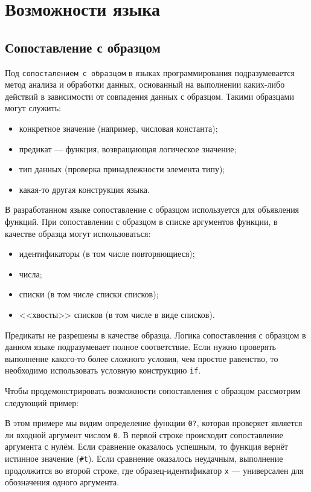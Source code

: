 \section{Возможности языка}
    \subsection{Сопоставление с образцом}
    Под \verb,сопосталением с образцом, в языках программирования подразумевается метод анализа и обработки данных, основанный на выполнении каких-либо действий в зависимости от совпадения данных с образцом.
    Такими образцами могут служить:
    \begin{itemize}
        \item конкретное значение (например, числовая константа);
        \item предикат --- функция, возвращающая логическое значение;
        \item тип данных (проверка принадлежности элемента типу);
        \item какая-то другая конструкция языка.
    \end{itemize}

    В разработанном языке сопоставление с образцом используется для объявления функций.
    При сопоставлении с образцом в списке аргументов функции, в качестве образца могут использоваться:
    \begin{itemize}
        \item идентификаторы (в том числе повторяющиеся);
        \item числа;
        \item списки (в том числе списки списков);
        \item <<хвосты>> списков (в том числе в виде списков).
    \end{itemize}

    Предикаты не разрешены в качестве образца.
    Логика сопоставления с образцом в данном языке подразумевает полное соответствие.
    Если нужно проверять выполнение какого-то более сложного условия, чем простое равенство, то необходимо использовать условную конструкцию \verb,if,.
    
    Чтобы продемонстрировать возможности сопоставления с образцом рассмотрим следующий пример:

    

    В этом примере мы видим определение функции \verb,0?,, которая проверяет является ли входной аргумент числом \verb,0,.
    В первой строке происходит сопоставление аргумента с нулём.
    Если сравнение оказалось успешным, то функция вернёт истинное значение (\verb,#t,).
    Если сравнение оказалось неудачным, выполнение продолжится во второй строке, где образец-идентификатор \verb,x, --- универсален для обозначения одного аргумента.
    
